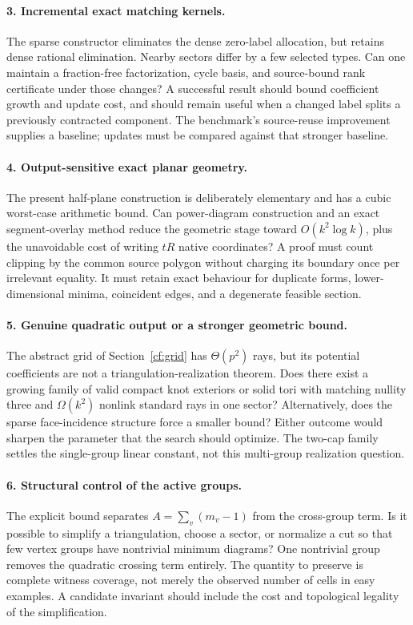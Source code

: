 \paragraph{3. Incremental exact matching kernels.}
The sparse constructor eliminates the dense zero-label allocation,
but retains dense rational elimination.  Nearby sectors differ
by a few selected types.  Can one maintain a fraction-free
factorization, cycle basis, and source-bound rank certificate under
those changes?  A successful result should bound coefficient growth
and update cost, and should remain useful when a changed label
splits a previously contracted component.  The benchmark's
source-reuse improvement supplies a baseline; updates must be
compared against that stronger baseline.

\paragraph{4. Output-sensitive exact planar geometry.}
The present half-plane construction is deliberately elementary
and has a cubic worst-case arithmetic bound.  Can power-diagram
construction and an exact segment-overlay method reduce the
geometric stage toward \(O(k^2\log k)\), plus the unavoidable
cost of writing \(tR\) native coordinates?  A proof must count
clipping by the common source polygon without charging its
boundary once per irrelevant equality.  It must retain exact
behaviour for duplicate forms, lower-dimensional minima,
coincident edges, and a degenerate feasible section.

\paragraph{5. Genuine quadratic output or a stronger geometric bound.}
The abstract grid of Section~\ref{cf:grid} has
\(\Theta(p^2)\) rays, but its potential coefficients are not a
triangulation-realization theorem.  Does there exist a growing
family of valid compact knot exteriors or solid tori with
matching nullity three and \(\Omega(k^2)\) nonlink standard
rays in one sector?  Alternatively, does the sparse face-incidence
structure force a smaller bound?  Either outcome would sharpen
the parameter that the search should optimize.  The two-cap
family settles the single-group linear constant, not this
multi-group realization question.

\paragraph{6. Structural control of the active groups.}
The explicit bound separates \(A=\sum_v(m_v-1)\) from the
cross-group term.  Is it possible to simplify a triangulation,
choose a sector, or normalize a cut so that few vertex groups
have nontrivial minimum diagrams?  One nontrivial group removes
the quadratic crossing term entirely.  The quantity to preserve
is complete witness coverage, not merely the observed number of
cells in easy examples.  A candidate invariant should include
the cost and topological legality of the simplification.

